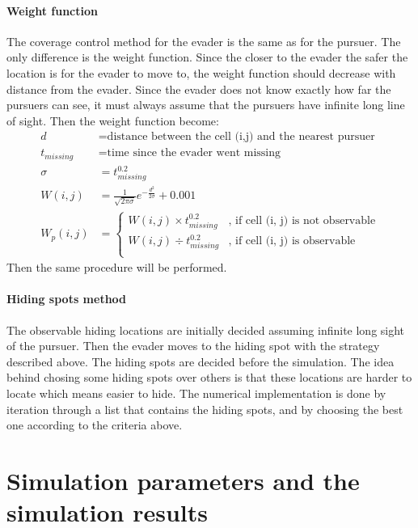 \documentclass[ebook,11pt] {kth-mag}
\begin{document}
\subsubsection{Weight function}
The coverage control method for the evader is the same as for the pursuer. The only difference is the weight function. Since the closer to the evader the safer the location is for the evader to move to, the weight function should decrease with distance from the evader. Since the evader does not know exactly how far the pursuers can see, it must always assume that the pursuers have infinite long line of sight. Then the weight function become: 
\begin{equation}
\begin{split}
d & = \textrm{distance between the cell (i,j) and the nearest pursuer} \\
t_{missing} & = \textrm{time since the evader went missing} \\
\sigma & = t_{missing}^{0.2} \\
W(i, j) & = \frac{1}{\sqrt{2 \pi \sigma}} e^{-\frac{d^2}{2\sigma}}+0.001 \\ 
W_p(i, j) & = 
\begin{cases}
W(i, j)\times t_{missing}^{0.2} & \textrm{, if cell (i, j) is not observable} \\
W(i, j)\div t_{missing}^{0.2} & \textrm{, if cell (i, j) is observable} \\
\end{cases}
\end{split}
\end{equation}
Then the same procedure will be performed. 

\subsubsection{Hiding spots method}
The observable hiding locations are initially decided assuming infinite long sight of the pursuer. Then the evader moves to the hiding spot with the strategy described above. The hiding spots are decided before the simulation. The idea behind chosing some hiding spots over others is that these locations are harder to locate which means easier to hide. The numerical implementation is done by iteration through a list that contains the hiding spots, and by choosing the best one according to the criteria above.


\chapter{Simulation parameters and the simulation results}
\end{document}
